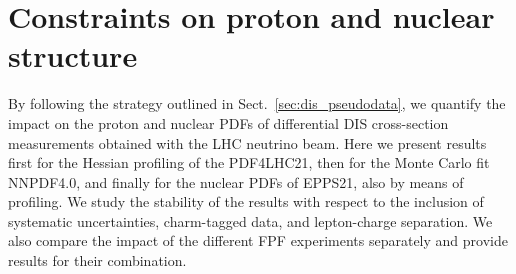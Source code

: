 \section{Constraints on proton and nuclear structure}
\label{sec:protonPDFs}

By following the strategy outlined in Sect.~\ref{sec:dis_pseudodata}, we 
quantify the impact on the proton and nuclear PDFs of differential  DIS
cross-section measurements obtained with the  LHC neutrino beam. 
%
Here we present results first for the Hessian profiling of the PDF4LHC21,
then for the Monte Carlo fit NNPDF4.0, and finally for the nuclear PDFs of EPPS21, also
by means of profiling.
%
We study the stability of the results with respect to the inclusion of systematic uncertainties,
charm-tagged data, and lepton-charge separation.
%
We also compare the impact of the different FPF experiments separately and provide
results for their combination.

